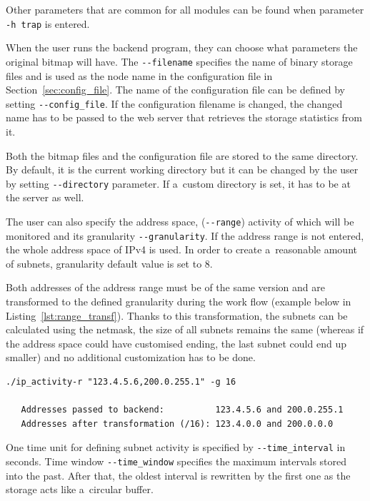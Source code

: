 Other parameters that are common for all modules can be found when parameter \texttt{-h trap} is entered.

When the user runs the backend program, they can choose what parameters the original bitmap will have.
The \texttt{-{}-filename} specifies the name of binary storage files and is used as the node name in the configuration file in Section~\ref{sec:config_file}.
The name of the configuration file can be defined by setting \texttt{-{}-config\_file}. If the configuration filename is changed, the changed
name has to be passed to the web server that retrieves the storage statistics from it.

Both the bitmap files and the configuration file are stored to the same directory. By default, it is the current working directory but
it can be changed by the user by setting \texttt{-{}-directory} parameter. If a~custom directory is set, it has to be at the server as well.

The user can also specify the address space, (\texttt{-{}-range}) activity of which will be monitored and its granularity \texttt{-{}-granularity}.
If the address range is not entered, the whole address space of IPv4 is used. In order to create a~reasonable amount of subnets,
granularity default value is set to 8.

Both addresses of the address range must be of the same version and are transformed to the defined granularity during the work flow
(example below in Listing~\ref{lst:range_transf}). Thanks to this transformation,
the subnets can be calculated using the netmask, the size of all subnets
remains the same (whereas if the address space could have customised ending,
the last subnet could end up smaller) and no additional customization has to be done. 

\begin{lstlisting}[label={lst:range_transf},captionpos=b,caption={Address Range Transformation},language=HTML]
   ./ip_activity-r "123.4.5.6,200.0.255.1" -g 16

   Addresses passed to backend:          123.4.5.6 and 200.0.255.1
   Addresses after transformation (/16): 123.4.0.0 and 200.0.0.0
\end{lstlisting}

One time unit for defining subnet activity is specified by \texttt{-{}-time\_interval} in seconds. Time window \texttt{-{}-time\_window}
specifies the maximum intervals stored into the past. After that, the oldest interval is rewritten by the first one as the storage acts like
a~circular buffer.

